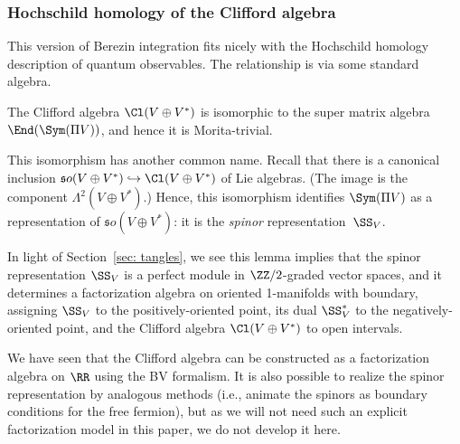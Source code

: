 \documentclass[10pt]{amsart}
\begin{document}
\subsubsection{Hochschild homology of the Clifford algebra}

This version of Berezin integration fits nicely with the Hochschild homology description of quantum observables.
The relationship is via some standard algebra.

\begin{lmm}
\label{lmm: cliff morita trivial}
The Clifford algebra $\Cl(V \oplus V^*)$ is isomorphic to the super matrix algebra $\End(\Sym(\Pi V))$, and hence it is Morita-trivial.
\end{lmm}

This isomorphism has another common name. 
Recall that there is a canonical inclusion ${\mathfrak so}(V\oplus V^*) \hookrightarrow \Cl(V \oplus V^*)$ of Lie algebras.
(The image is the component $\Lambda^2 (V \oplus V^*)$.)
Hence, this isomorphism identifies $\Sym(\Pi V)$ as a representation of ${\mathfrak so}(V\oplus V^*)$:
it is the {\em spinor} representation~$\SS_V$. 

In light of Section~\ref{sec: tangles}, we see this lemma implies 
that the spinor representation $\SS_V$ is a perfect module in $\ZZ/2$-graded vector spaces, 
and it determines a factorization algebra on oriented 1-manifolds with boundary,
assigning $\SS_V$ to the positively-oriented point, its dual $\SS_V^*$ to the negatively-oriented point,
and the Clifford algebra $\Cl(V \oplus V^*)$ to open intervals.

\begin{rmk}
We have seen that the Clifford algebra can be constructed as a factorization algebra on $\RR$ using the BV formalism. 
It is also possible to realize the spinor representation by analogous methods
(i.e., animate the spinors as boundary conditions for the free fermion),
but as we will not need such an explicit factorization model in this paper,
we do not develop it here.
\end{rmk}
\end{document}
